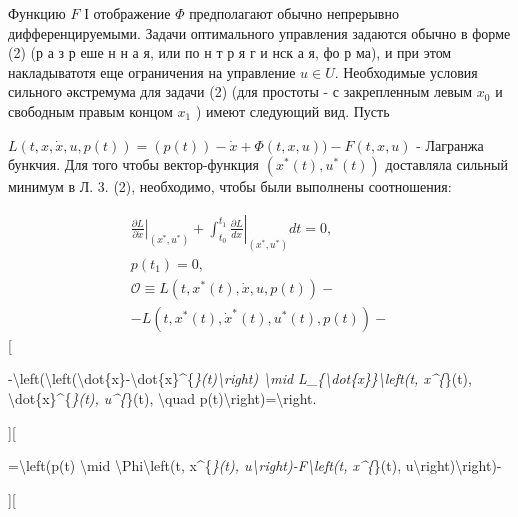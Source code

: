 \documentclass[10pt]{article}
\begin{document}
Функцию $F$ І отображение $\Phi$ предполагают обычно непрерывно дифференцируемыми. Задачи оптимального управления задаются обычно в форме (2) (р а з р еше н н а я, или по н т р я г и нск а я, фо р ма), и при этом накладыватотя еще ограничения на управление $u \in U$. Необходимые условия сильного әкстремума для задачи (2) (для простоты - с закрепленным левым $x_{0}$ и свободным правым концом $x_{1}$ ) имеют следующий вид. Пусть



$L(t, x, \dot{x}, u, p(t))=(p(t))-\dot{x}+\Phi(t, x, u))-F(t, x, u)$ - Лагранжа бункчия. Для того чтобы вектор-функция $\left(x^{*}(t), u^{*}(t)\right)$ доставляла сильный минимум в Л. 3. (2), необходимо, чтобы были выполнены соотношения:



\[

\begin{gathered}

\left.\frac{\partial L}{\partial \dot{x}}\right|_{\left(x^{*}, u^{*}\right)}+\left.\int_{t_{0}}^{t_{1}} \frac{\partial L}{d x}\right|_{\left(x^{*}, u^{*}\right)} d t=0, \\

p\left(t_{1}\right)=0, \\

\mathscr{O} \equiv L\left(t, x^{*}(t), \dot{x}, u, p(t)\right)- \\

-L\left(t, x^{*}(t), \dot{x}^{*}(t), u^{*}(t), p(t)\right)-

\end{gathered}

\][



-\textbackslash left(\textbackslash left(\textbackslash dot\{x\}-\textbackslash dot\{x\}\^{}\{\textit{\}(t)\textbackslash right) \textbackslash mid L\_\{\textbackslash dot\{x\}\}\textbackslash left(t, x\^{}\{}\}(t), \textbackslash dot\{x\}\^{}\{\textit{\}(t), u\^{}\{}\}(t), \textbackslash quad p(t)\textbackslash right)=\textbackslash right.



][



=\textbackslash left(p(t) \textbackslash mid \textbackslash Phi\textbackslash left(t, x\^{}\{\textit{\}(t), u\textbackslash right)-F\textbackslash left(t, x\^{}\{}\}(t), u\textbackslash right)\textbackslash right)-



][
\end{document}
